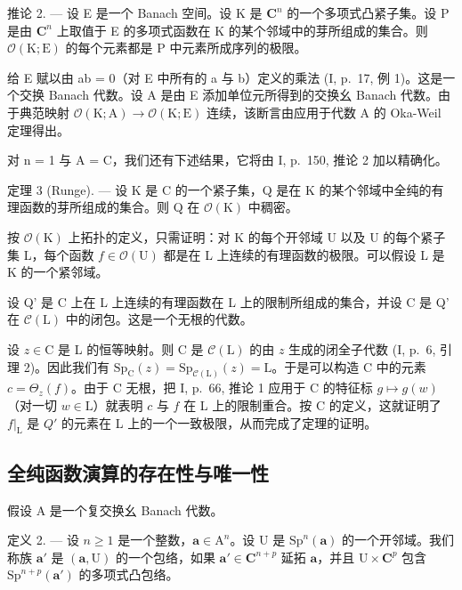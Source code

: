 推论 2. --- 设 E 是一个 Banach 空间。设 K 是 \(\mathbf{C}^{n}\) 的一个多项式凸紧子集。设 P 是由 \(\mathbf{C}^{n}\) 上取值于 E 的多项式函数在 K 的某个邻域中的芽所组成的集合。则 \(\mathcal{O}(\mathrm{K};\mathrm{E})\) 的每个元素都是 P 中元素所成序列的极限。

给 E 赋以由 ab = 0（对 E 中所有的 a 与 b）定义的乘法 (I, p.~17, 例 1)。这是一个交换 Banach 代数。设 A 是由 E 添加单位元所得到的交换幺 Banach 代数。由于典范映射 \(\mathcal{O}(\mathrm{K};\mathrm{A}) \to \mathcal{O}(\mathrm{K};\mathrm{E})\) 连续，该断言由应用于代数 A 的 Oka-Weil 定理得出。

对 n = 1 与 A = C，我们还有下述结果，它将由 I, p.~150, 推论 2 加以精确化。

定理 3 (Runge). --- 设 K 是 C 的一个紧子集，Q 是在 K 的某个邻域中全纯的有理函数的芽所组成的集合。则 Q 在 \(\mathcal{O}(\mathrm{K})\) 中稠密。

按 \(\mathcal{O}(\mathrm{K})\) 上拓扑的定义，只需证明：对 K 的每个开邻域 U 以及 U 的每个紧子集 L，每个函数 \(f \in \mathcal{O}(\mathrm{U})\) 都是在 L 上连续的有理函数的极限。可以假设 L 是 K 的一个紧邻域。

设 Q' 是 C 上在 L 上连续的有理函数在 L 上的限制所组成的集合，并设 C 是 Q' 在 \(\mathcal{C}(\mathrm{L})\) 中的闭包。这是一个无根的代数。

设 \(z \in \mathrm{C}\) 是 L 的恒等映射。则 C 是 \(\mathcal{C}(\mathrm{L})\) 的由 \(z\) 生成的闭全子代数 (I, p.~6, 引理 2)。因此我们有 \(\mathrm{Sp}_{\mathrm{C}}(z) = \mathrm{Sp}_{\mathcal{C}(\mathrm{L})}(z) = \mathrm{L}\)。于是可以构造 C 中的元素 \(c = \Theta_z(f)\)。由于 C 无根，把 I, p.~66, 推论 1 应用于 C 的特征标 \(g \mapsto g(w)\)（对一切 \(w \in \mathrm{L}\)）就表明 \(c\) 与 \(f\) 在 L 上的限制重合。按 C 的定义，这就证明了 \(f|_{\mathrm{L}}\) 是 \(Q'\) 的元素在 L 上的一个一致极限，从而完成了定理的证明。

\subsection{全纯函数演算的存在性与唯一性}

假设 A 是一个复交换幺 Banach 代数。

定义 2. --- 设 \(n \geqslant 1\) 是一个整数，\(\boldsymbol{a} \in \mathrm{A}^{n}\)。设 U 是 \(\mathrm{Sp}^{n}(\boldsymbol{a})\) 的一个开邻域。我们称族 \(\boldsymbol{a}'\) 是 \((\boldsymbol{a}, \mathrm{U})\) 的一个包络，如果 \(\boldsymbol{a}' \in \mathbf{C}^{n+p}\) 延拓 \(\boldsymbol{a}\)，并且 \(\mathrm{U} \times \mathbf{C}^{p}\) 包含 \(\mathrm{Sp}^{n+p}(\boldsymbol{a}')\) 的多项式凸包络。

